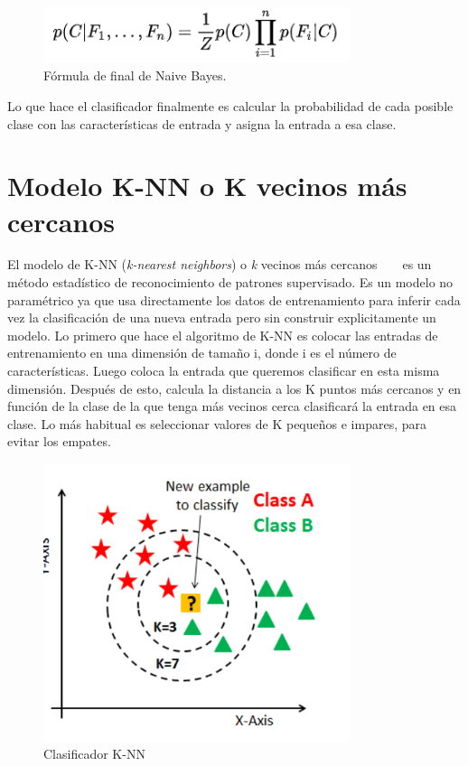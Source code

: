 \documentclass[a4paper, 12pt]{book}
\begin{document}
\begin{figure}
	\centering
	\includegraphics[width=9cm, keepaspectratio]{img/ffinalbayes}
	\caption{Fórmula de final de Naive Bayes.}\label{fig:ffinalbayes}
\end{figure}

Lo que hace el clasificador finalmente es calcular la probabilidad de cada posible clase con las características de entrada y asigna la entrada a esa clase.

\section{Modelo K-NN o K vecinos más cercanos} 
\label{sec:modeloknn}

El modelo de K-NN (\emph{k-nearest neighbors}) o \emph{k} vecinos más cercanos ~\cite{knn1} ~\cite{knn2} es un método estadístico de reconocimiento de patrones supervisado. Es un modelo no paramétrico ya que usa directamente los datos de entrenamiento para inferir cada vez la clasificación de una nueva entrada pero sin construir explicitamente un modelo. Lo primero que hace el algoritmo de K-NN es colocar las entradas de entrenamiento en una dimensión de tamaño i, donde i es el número de características. Luego coloca la entrada que queremos clasificar en esta misma dimensión. Después de esto, calcula la distancia a los K puntos más cercanos y en función de la clase de la que tenga más vecinos cerca clasificará la entrada en esa clase. Lo más habitual es seleccionar valores de K pequeños e impares, para evitar los empates. 

\begin{figure}
	\centering
	\includegraphics[width=9cm, keepaspectratio]{img/knn}
	\caption{Clasificador K-NN}\label{fig:knn}
\end{figure}
\end{document}
